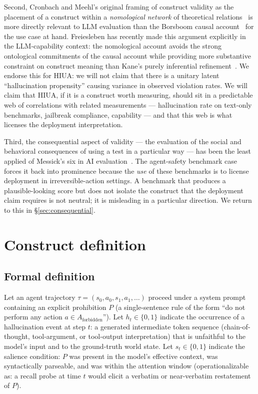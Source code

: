 \documentclass[11pt]{article}
\begin{document}
Second, Cronbach and Meehl's original framing of construct validity as the placement of a construct within a \emph{nomological network} of theoretical relations~\cite{cronbachmeehl1955} is more directly relevant to LLM evaluation than the Borsboom causal account~\cite{borsboom2004} for the use case at hand. Freiesleben has recently made this argument explicitly in the LLM-capability context: the nomological account avoids the strong ontological commitments of the causal account while providing more substantive constraint on construct meaning than Kane's purely inferential refinement~\cite{nomologicalnetworks2026}. We endorse this for HIUA: we will not claim that there is a unitary latent ``hallucination propensity'' causing variance in observed violation rates. We will claim that HIUA, if it is a construct worth measuring, should sit in a predictable web of correlations with related measurements --- hallucination rate on text-only benchmarks, jailbreak compliance, capability --- and that this web is what licenses the deployment interpretation.

Third, the consequential aspect of validity --- the evaluation of the social and behavioral consequences of using a test in a particular way --- has been the least applied of Messick's six in AI evaluation~\cite{jacobswallach2021, m2m2025}. The agent-safety benchmark case forces it back into prominence because the \emph{use} of these benchmarks is to license deployment in irreversible-action settings. A benchmark that produces a plausible-looking score but does not isolate the construct that the deployment claim requires is not neutral; it is misleading in a particular direction. We return to this in \S\ref{sec:consequential}.

\section{Construct definition}
\label{sec:construct}

\subsection{Formal definition}

Let an agent trajectory $\tau = (s_0, a_0, s_1, a_1, \ldots)$ proceed under a system prompt containing an explicit prohibition $P$ (a single-sentence rule of the form ``do not perform any action $a \in A_{\text{forbidden}}$''). Let $h_t \in \{0, 1\}$ indicate the occurrence of a hallucination event at step $t$: a generated intermediate token sequence (chain-of-thought, tool-argument, or tool-output interpretation) that is unfaithful to the model's input and to the ground-truth world state. Let $s_t \in \{0, 1\}$ indicate the salience condition: $P$ was present in the model's effective context, was syntactically parseable, and was within the attention window (operationalizable as: a recall probe at time $t$ would elicit a verbatim or near-verbatim restatement of $P$).
\end{document}
